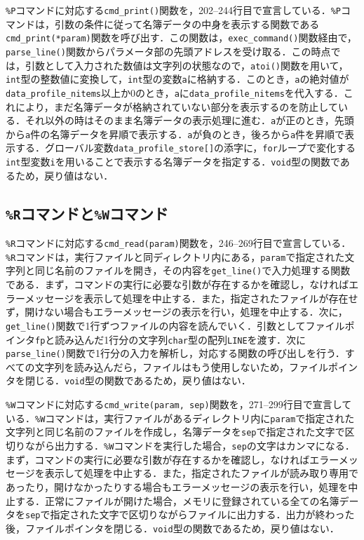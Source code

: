 \verb|%P|コマンドに対応する\verb|cmd_print()|関数を，202--244行目で宣言している．\verb|%P|コマンドは，引数の条件に従って名簿データの中身を表示する関数である\verb|cmd_print(*param)|関数を呼び出す．この関数は，\verb|exec_command()|関数経由で，\verb|parse_line()|関数からパラメータ部の先頭アドレスを受け取る．この時点では，引数として入力された数値は文字列の状態なので，\verb|atoi()|関数を用いて，\verb|int|型の整数値に変換して，\verb|int|型の変数\verb|a|に格納する．このとき，\verb|a|の絶対値が\verb|data_profile_nitems|以上か$0$のとき，\verb|a|に\verb|data_profile_nitems|を代入する．これにより，まだ名簿データが格納されていない部分を表示するのを防止している．それ以外の時はそのまま名簿データの表示処理に進む．\verb|a|が正のとき，先頭から\verb|a|件の名簿データを昇順で表示する．\verb|a|が負のとき，後ろから\verb|a|件を昇順で表示する．グローバル変数\verb|data_profile_store[]|の添字に，\verb|for|ループで変化する\verb|int|型変数\verb|i|を用いることで表示する名簿データを指定する．\verb|void|型の関数であるため，戻り値はない．

\subsection{\texttt{\%R}コマンドと\texttt{\%W}コマンド}

\verb|%R|コマンドに対応する\verb|cmd_read(param)|関数を，246--269行目で宣言している．\verb|%R|コマンドは，実行ファイルと同ディレクトリ内にある，\verb|param|で指定された文字列と同じ名前のファイルを開き，その内容を\verb|get_line()|で入力処理する関数である．まず，コマンドの実行に必要な引数が存在するかを確認し，なければエラーメッセージを表示して処理を中止する．また，指定されたファイルが存在せず，開けない場合もエラーメッセージの表示を行い，処理を中止する．次に，\verb|get_line()|関数で1行ずつファイルの内容を読んでいく．引数としてファイルポインタ\verb|fp|と読み込んだ1行分の文字列\verb|char|型の配列\verb|LINE|を渡す．次に\verb|parse_line()|関数で1行分の入力を解析し，対応する関数の呼び出しを行う．すべての文字列を読み込んだら，ファイルはもう使用しないため，ファイルポインタを閉じる．\verb|void|型の関数であるため，戻り値はない．

\verb|%W|コマンドに対応する\verb|cmd_write(param, sep)|関数を，271--299行目で宣言している．\verb|%W|コマンドは，実行ファイルがあるディレクトリ内に\verb|param|で指定された文字列と同じ名前のファイルを作成し，名簿データを\verb|sep|で指定された文字で区切りながら出力する．\verb|%W|コマンドを実行した場合，\verb|sep|の文字はカンマになる．まず，コマンドの実行に必要な引数が存在するかを確認し，なければエラーメッセージを表示して処理を中止する．また，指定されたファイルが読み取り専用であったり，開けなかったりする場合もエラーメッセージの表示を行い，処理を中止する．正常にファイルが開けた場合，メモリに登録されている全ての名簿データを\verb|sep|で指定された文字で区切りながらファイルに出力する．出力が終わった後，ファイルポインタを閉じる．\verb|void|型の関数であるため，戻り値はない．

